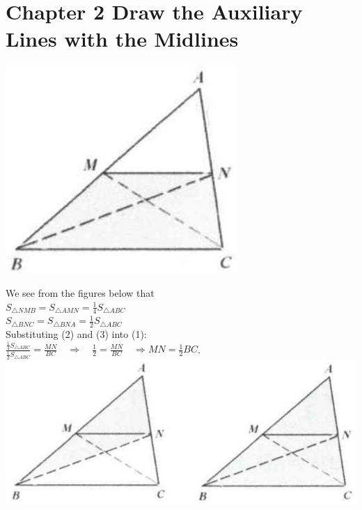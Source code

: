\documentclass{article}
\begin{document}
\section*{Chapter 2 Draw the Auxiliary Lines with the Midlines}
\begin{center}
\includegraphics[width=\textwidth]{images/033.jpg}
\end{center}

We see from the figures below that\\
\(S_{\triangle N M B}=S_{\triangle A M N}=\frac{1}{4} S_{\triangle A B C}\)\\
\(S_{\triangle B N C}=S_{\triangle B N A}=\frac{1}{2} S_{\triangle A B C}\)\\
Substituting (2) and (3) into (1):\\
\(\frac{\frac{1}{4} S_{\triangle A B C}}{\frac{1}{2} S_{\triangle A B C}}=\frac{M N}{B C} \quad \Rightarrow \quad \frac{1}{2}=\frac{M N}{B C} \quad \Rightarrow M N=\frac{1}{2} B C\).\\
\centering
\includegraphics[width=\textwidth]{images/033(2).jpg}
\end{document}
